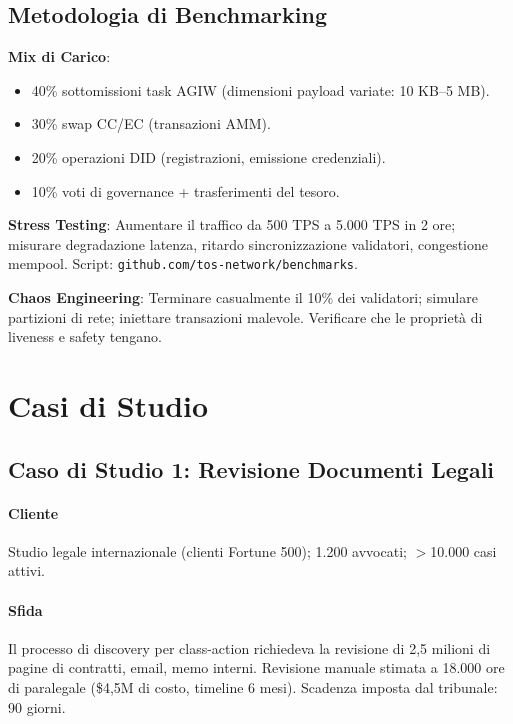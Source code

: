 \documentclass[11pt]{article}
\begin{document}
\begin{itemize}[noitemsep]
\subsection{Metodologia di Benchmarking}

\textbf{Mix di Carico}:
\begin{itemize}[noitemsep]
  \item 40\% sottomissioni task AGIW (dimensioni payload variate: 10 KB--5 MB).
  \item 30\% swap CC/EC (transazioni AMM).
  \item 20\% operazioni DID (registrazioni, emissione credenziali).
  \item 10\% voti di governance + trasferimenti del tesoro.
\end{itemize}

\textbf{Stress Testing}: Aumentare il traffico da 500 TPS a 5.000 TPS in 2 ore; misurare degradazione latenza, ritardo sincronizzazione validatori, congestione mempool. Script: \texttt{github.com/tos-network/benchmarks}.

\textbf{Chaos Engineering}: Terminare casualmente il 10\% dei validatori; simulare partizioni di rete; iniettare transazioni malevole. Verificare che le proprietà di liveness e safety tengano.

\section{Casi di Studio}
\label{sec:case-studies}

\subsection{Caso di Studio 1: Revisione Documenti Legali}

\paragraph{Cliente} Studio legale internazionale (clienti Fortune 500); 1.200 avvocati; $>$10.000 casi attivi.

\paragraph{Sfida} Il processo di discovery per class-action richiedeva la revisione di 2,5 milioni di pagine di contratti, email, memo interni. Revisione manuale stimata a 18.000 ore di paralegale (\$4,5M di costo, timeline 6 mesi). Scadenza imposta dal tribunale: 90 giorni.


\end{itemize}
\end{document}
